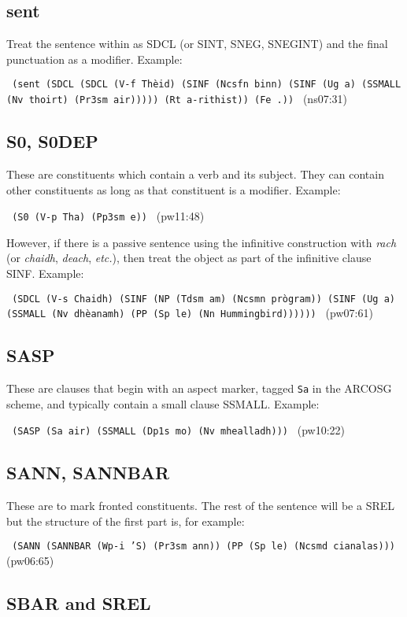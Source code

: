 \documentclass[a4paper]{article}
\begin{document}
\subsection{sent}

Treat the sentence within as SDCL (or SINT, SNEG, SNEGINT) and the final punctuation as a modifier.
Example:

\texttt{
(sent (SDCL (SDCL (V-f Th\`eid) (SINF (Ncsfn binn) (SINF (Ug a) (SSMALL (Nv thoirt) (Pr3sm air))))) (Rt a-rithist)) (Fe .))
} (ns07:31)

\subsection{S0, S0DEP}

These are constituents which contain a verb and its subject.
They can contain other constituents as long as that constituent is a modifier.
Example:

\texttt{
(S0 (V-p Tha) (Pp3sm e))
} (pw11:48)

However, if there is a passive sentence using the infinitive construction with \textit{rach} (or \textit{chaidh}, \textit{deach}, \textit{etc.}), then treat the object as part of the infinitive clause SINF.
Example:

\texttt{
(SDCL (V-s Chaidh) (SINF (NP (Tdsm am) (Ncsmn pr\`ogram)) (SINF (Ug a) (SSMALL (Nv dh\`eanamh) (PP (Sp le) (Nn Hummingbird))))))
} (pw07:61)

\subsection{SASP}

These are clauses that begin with an aspect marker, tagged \texttt{Sa} in the ARCOSG scheme, and typically contain a small clause SSMALL.
Example:

\texttt{
(SASP (Sa air) (SSMALL (Dp1s mo) (Nv mhealladh)))
} (pw10:22)

\subsection{SANN, SANNBAR}

These are to mark fronted constituents.
The rest of the sentence will be a SREL but the structure of the first part is, for example:

\texttt{
(SANN (SANNBAR (Wp-i 'S) (Pr3sm ann)) (PP (Sp le) (Ncsmd cianalas)))
} (pw06:65)

\subsection{SBAR and SREL}
\end{document}
